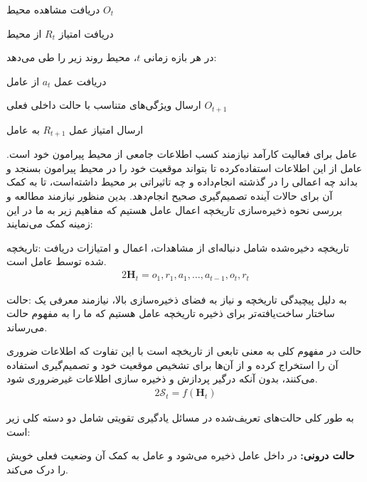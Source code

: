  دریافت مشاهده محیط $O_t$

 دریافت امتیاز $R_t$ از محیط



 در هر بازه زمانی $t$، محیط روند زیر را طی می‌دهد:


 دریافت عمل $a_t$ از عامل

 ارسال ویژگی‌های متناسب با حالت داخلی فعلی $O_{t+1}$

 ارسال امتیاز عمل $R_{t+1}$ به عامل






عامل برای فعالیت کارآمد نیازمند کسب اطلاعات جامعی از محیط پیرامون خود است. عامل از این اطلاعات استفاده‌کرده تا بتواند موقعیت خود را در محیط پیرامون بسنجد و بداند چه اعمالی را در گذشته انجام‌‌داده و چه تاثیراتی بر محیط داشته‌است، تا به کمک آن برای حالات آینده تصمیم‌گیری صحیح انجام‌دهد. بدین منظور نیازمند مطالعه و بررسی نحوه ذخیره‌سازی تاریخچه اعمال عامل هستیم که مفاهیم زیر به ما در این زمینه کمک می‌نمایند:


 $\textbf{تاریخچه}$: تاریخچه دخیره‌شده شامل دنباله‌ای از مشاهدات، اعمال و امتیازات دریافت شده توسط عامل است.
\begin{alignat}{2}
	\textbf{H}_t = o_1,r_1,a_1, \ldots , a_{t-1}, o_t, r_t
	\label{101}  
\end{alignat}  




 $\textbf{حالت}$: به دلیل پیچیدگی تاریخچه و نیاز به فضای ذخیره‌سازی بالا، نیازمند معرفی یک ساختار ساخت‌یافته‌تر برای ذخیره تاریخچه عامل هستیم که ما را به مفهوم حالت می‌رساند. 

حالت در مفهوم کلی به معنی تابعی از تاریخچه است با این تفاوت که اطلاعات ضروری آن را استخراج کرده و از آن‌ها برای  تشخیص موقعیت خود و تصمیم‌گیری استفاده می‌کنند، بدون آنکه درگیر پردازش و ذخیره سازی اطلاعات غیرضروری شود.
\begin{alignat}{2}
	\mathcal{S}_t = f(\textbf{H}_t)
	\label{102}  
\end{alignat}  


به طور کلی حالت‌های تعریف‌شده در مسائل یادگیری تقویتی شامل دو دسته کلی زیر است:


 \textbf{حالت درونی:} در داخل عامل ذخیره می‌شود و عامل به کمک آن وضعیت فعلی خویش را درک می‌کند. 

